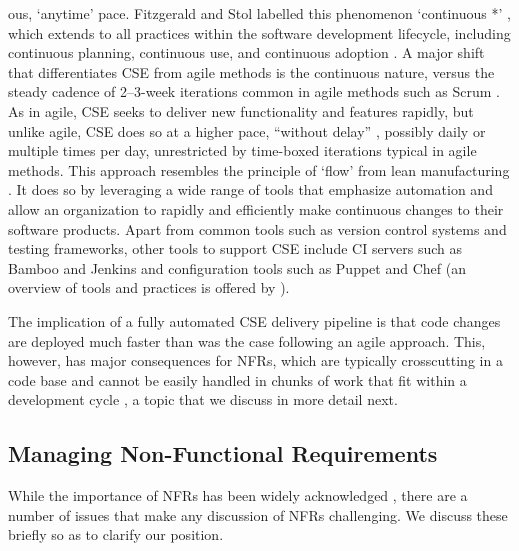 \documentclass[smallextended]{svjour3}
\begin{document}
ous, `anytime' pace. Fitzgerald and Stol labelled this phenomenon `continuous *' \citep{fitzgerald2017continuous}, which extends to all practices within the software development lifecycle, including continuous planning, continuous use, and continuous adoption \citep{barbala2024hicss}. 
A major shift that differentiates CSE from agile methods is the continuous nature, versus the steady cadence of 2--3-week iterations common in agile methods such as Scrum \citep{fitzgerald2017continuous,klotins2023continuous,tkalich2025user}. As in agile, CSE seeks to deliver new functionality and features rapidly, but unlike agile, CSE does so at a higher pace, ``without delay'' \citep{klotins2023continuous}, possibly daily or multiple times per day, unrestricted by time-boxed iterations typical in agile methods.
This approach resembles the principle of `flow' from lean manufacturing \citep{fitzgerald2017continuous}.
It does so by leveraging a wide range of tools that emphasize automation and allow an organization to rapidly and efficiently make continuous changes to their software products. Apart from common tools such as version control systems and testing frameworks, other tools to support CSE include CI servers such as Bamboo and Jenkins and configuration tools such as Puppet and Chef (an overview of tools and practices is offered by \citet{shahin2017continuous}). 

The implication of a fully automated CSE delivery pipeline is that code changes are deployed much faster than was the case following an agile approach. 
This, however, has major consequences for NFRs, which are typically crosscutting in a code base and cannot be easily handled in chunks of work that fit within a development cycle \citep{bellomo_evolutionary_2014}, a topic that we discuss in more detail next.




\subsection{Managing Non-Functional Requirements}
\label{sec:nfr}



While the importance of NFRs has been widely acknowledged \citep{glinz_non-functional_2007,mairiza2010investigation,borg2003bad}, there are a number of issues that make any discussion of NFRs challenging. We discuss these briefly so as to clarify our position.
\end{document}
